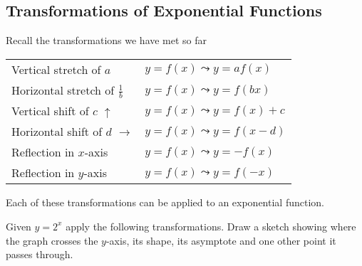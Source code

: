 \subsection{Transformations of Exponential Functions}
Recall the transformations we have met so far 


\begin{tabular}[c]{ll}Vertical stretch of $a$  & $y =f (x) \leadsto y =a f (x)$  \\
Horizontal stretch of $\frac{1}{b}$  & $y =f (x) \leadsto y =f (b x)$  \\
Vertical shift of $c$ $\uparrow $  & $y =f (x) \leadsto y =f (x) +c$  \\
Horizontal shift of $d$ $ \longrightarrow $  & $y =f (x) \leadsto y =f (x -d)$  \\
Reflection in $x$-axis  & $y =f (x) \leadsto y = -f (x)$  \\
Reflection in $y$-axis  & $y =f (x) \leadsto y =f ( -x)$
\end{tabular}

Each of these transformations can be applied to an exponential
function. 

Given $y =2^{x}$ apply the following transformations. Draw a sketch showing where the graph crosses the
$y$-axis, its shape, its asymptote and one other point it passes through. 


